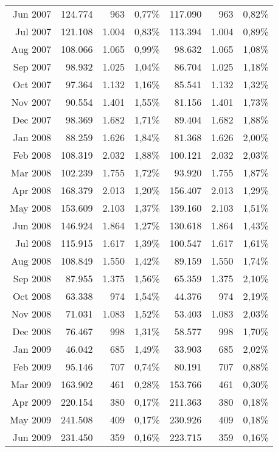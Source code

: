 \begin{longtable}{r|rrr|rrr}
Jun 2007 & 124.774 & 963   & 0,77\% & 117.090 & 963   & 0,82\% \\
Jul 2007 & 121.108 & 1.004 & 0,83\% & 113.394 & 1.004 & 0,89\% \\
Aug 2007 & 108.066 & 1.065 & 0,99\% & 98.632  & 1.065 & 1,08\% \\
Sep 2007 & 98.932  & 1.025 & 1,04\% & 86.704  & 1.025 & 1,18\% \\
Oct 2007 & 97.364  & 1.132 & 1,16\% & 85.541  & 1.132 & 1,32\% \\
Nov 2007 & 90.554  & 1.401 & 1,55\% & 81.156  & 1.401 & 1,73\% \\
Dec 2007 & 98.369  & 1.682 & 1,71\% & 89.404  & 1.682 & 1,88\% \\
Jan 2008 & 88.259  & 1.626 & 1,84\% & 81.368  & 1.626 & 2,00\% \\
Feb 2008 & 108.319 & 2.032 & 1,88\% & 100.121 & 2.032 & 2,03\% \\
Mar 2008 & 102.239 & 1.755 & 1,72\% & 93.920  & 1.755 & 1,87\% \\
Apr 2008 & 168.379 & 2.013 & 1,20\% & 156.407 & 2.013 & 1,29\% \\
May 2008 & 153.609 & 2.103 & 1,37\% & 139.160 & 2.103 & 1,51\% \\
Jun 2008 & 146.924 & 1.864 & 1,27\% & 130.618 & 1.864 & 1,43\% \\
Jul 2008 & 115.915 & 1.617 & 1,39\% & 100.547 & 1.617 & 1,61\% \\
Aug 2008 & 108.849 & 1.550 & 1,42\% & 89.159  & 1.550 & 1,74\% \\
Sep 2008 & 87.955  & 1.375 & 1,56\% & 65.359  & 1.375 & 2,10\% \\
Oct 2008 & 63.338  & 974   & 1,54\% & 44.376  & 974   & 2,19\% \\
Nov 2008 & 71.031  & 1.083 & 1,52\% & 53.403  & 1.083 & 2,03\% \\
Dec 2008 & 76.467  & 998   & 1,31\% & 58.577  & 998   & 1,70\% \\
Jan 2009 & 46.042  & 685   & 1,49\% & 33.903  & 685   & 2,02\% \\
Feb 2009 & 95.146  & 707   & 0,74\% & 80.191  & 707   & 0,88\% \\
Mar 2009 & 163.902 & 461   & 0,28\% & 153.766 & 461   & 0,30\% \\
Apr 2009 & 220.154 & 380   & 0,17\% & 211.363 & 380   & 0,18\% \\
May 2009 & 241.508 & 409   & 0,17\% & 230.926 & 409   & 0,18\% \\
Jun 2009 & 231.450 & 359   & 0,16\% & 223.715 & 359   & 0,16\% \\

\end{longtable}
